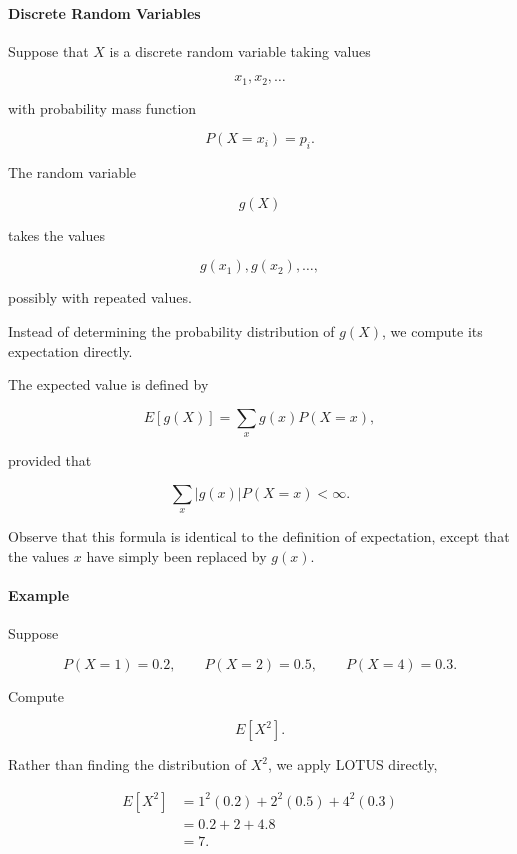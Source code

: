 \documentclass[11pt]{article}
\begin{document}
\begin{mdframed}[
		linewidth=0.8pt,
		roundcorner=6pt,
		backgroundcolor=gray!5,
		linecolor=gray!60,
		innertopmargin=10pt,
		innerbottommargin=10pt,
		innerleftmargin=10pt,
		innerrightmargin=10pt
		]
		\bigskip
		
		\paragraph{Discrete Random Variables}
		
		Suppose that $X$ is a discrete random variable taking values
		
		\[
		x_1,x_2,\ldots
		\]
		
		with probability mass function
		
		\[
		P(X=x_i)=p_i.
		\]
		
		The random variable
		
		\[
		g(X)
		\]
		
		takes the values
		
		\[
		g(x_1),g(x_2),\ldots,
		\]
		
		possibly with repeated values.
		
		Instead of determining the probability distribution of $g(X)$, we compute
		its expectation directly.
		
		The expected value is defined by
		
		\[
		\boxed{
			E[g(X)]
			=
			\sum_x
			g(x)P(X=x),
		}
		\]
		
		provided that
		
		\[
		\sum_x
		|g(x)|P(X=x)
		<
		\infty.
		\]
		
		Observe that this formula is identical to the definition of expectation,
		except that the values $x$ have simply been replaced by $g(x)$.
		
		\bigskip
		
		\paragraph{Example}
		
		Suppose
		
		\[
		P(X=1)=0.2,
		\qquad
		P(X=2)=0.5,
		\qquad
		P(X=4)=0.3.
		\]
		
		Compute
		
		\[
		E[X^2].
		\]
		
		Rather than finding the distribution of $X^2$, we apply LOTUS directly,
		
		\[
		\begin{aligned}
			E[X^2]
			&=
			1^2(0.2)
			+
			2^2(0.5)
			+
			4^2(0.3)
			\\[0.3cm]
			&=
			0.2
			+
			2
			+
			4.8
			\\[0.3cm]
			&=
			7.
		\end{aligned}
		\]
		

\end{mdframed}
\end{document}
